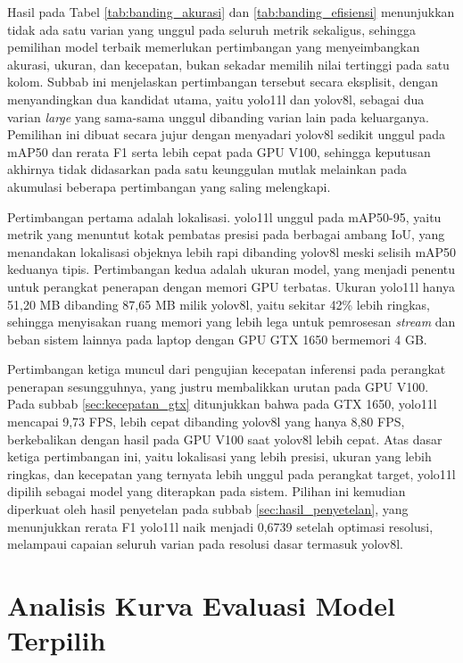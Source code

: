 Hasil pada Tabel \ref{tab:banding_akurasi} dan \ref{tab:banding_efisiensi} menunjukkan tidak 
ada satu varian yang unggul pada seluruh metrik sekaligus, sehingga pemilihan model terbaik 
memerlukan pertimbangan yang menyeimbangkan akurasi, ukuran, dan kecepatan, bukan sekadar 
memilih nilai tertinggi pada satu kolom. Subbab ini menjelaskan pertimbangan tersebut secara 
eksplisit, dengan menyandingkan dua kandidat utama, yaitu yolo11l dan yolov8l, sebagai dua 
varian \textit{large} yang sama-sama unggul dibanding varian lain pada keluarganya. 
Pemilihan ini dibuat secara jujur dengan menyadari yolov8l sedikit unggul pada mAP50 dan 
rerata F1 serta lebih cepat pada GPU V100, sehingga keputusan akhirnya tidak didasarkan pada 
satu keunggulan mutlak melainkan pada akumulasi beberapa pertimbangan yang saling melengkapi.

Pertimbangan pertama adalah lokalisasi. yolo11l unggul pada mAP50-95, yaitu metrik yang 
menuntut kotak pembatas presisi pada berbagai ambang IoU, yang menandakan lokalisasi 
objeknya lebih rapi dibanding yolov8l meski selisih mAP50 keduanya tipis. Pertimbangan 
kedua adalah ukuran model, yang menjadi penentu untuk perangkat penerapan dengan memori GPU 
terbatas. Ukuran yolo11l hanya 51,20 MB dibanding 87,65 MB milik yolov8l, yaitu sekitar 42\% 
lebih ringkas, sehingga menyisakan ruang memori yang lebih lega untuk pemrosesan 
\textit{stream} dan beban sistem lainnya pada laptop dengan GPU GTX 1650 bermemori 4 GB.

Pertimbangan ketiga muncul dari pengujian kecepatan inferensi pada perangkat penerapan 
sesungguhnya, yang justru membalikkan urutan pada GPU V100. Pada subbab 
\ref{sec:kecepatan_gtx} ditunjukkan bahwa pada GTX 1650, yolo11l mencapai 9,73 FPS, lebih 
cepat dibanding yolov8l yang hanya 8,80 FPS, berkebalikan dengan hasil pada GPU V100 saat 
yolov8l lebih cepat. Atas dasar ketiga pertimbangan ini, yaitu lokalisasi yang lebih presisi, 
ukuran yang lebih ringkas, dan kecepatan yang ternyata lebih unggul pada perangkat target, 
yolo11l dipilih sebagai model yang diterapkan pada sistem. Pilihan ini kemudian diperkuat 
oleh hasil penyetelan pada subbab \ref{sec:hasil_penyetelan}, yang menunjukkan rerata F1 
yolo11l naik menjadi 0,6739 setelah optimasi resolusi, melampaui capaian seluruh varian pada 
resolusi dasar termasuk yolov8l.

\section{Analisis Kurva Evaluasi Model Terpilih}
\label{sec:analisis_kurva}


